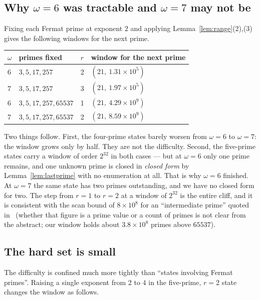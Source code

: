 \documentclass[11pt]{amsart}
\theoremstyle{remark}
\begin{document}
\subsection{Why \texorpdfstring{$\omega = 6$}{omega = 6} was tractable and
\texorpdfstring{$\omega = 7$}{omega = 7} may not be}
Fixing each Fermat prime at exponent $2$ and applying
Lemma~\ref{lem:range}(2),(3) gives the following windows for the next prime.

\begin{table}[h]
\centering
\begin{tabular}{llll}
\toprule
$\omega$ & primes fixed & $r$ & window for the next prime \\
\midrule
6 & $3,5,17,257$          & 2 & $(21,\ 1.31 \times 10^{5})$ \\
7 & $3,5,17,257$          & 3 & $(21,\ 1.97 \times 10^{5})$ \\
6 & $3,5,17,257,65537$    & 1 & $(21,\ 4.29 \times 10^{9})$ \\
7 & $3,5,17,257,65537$    & 2 & $(21,\ 8.59 \times 10^{9})$ \\
\bottomrule
\end{tabular}
\end{table}

Two things follow. First, the four-prime states barely worsen from $\omega = 6$
to $\omega = 7$: the window grows only by half. They are not the difficulty.
Second, the five-prime states carry a window of order $2^{32}$ in both cases ---
but at $\omega = 6$ only one prime remains, and one unknown prime is closed in
\emph{closed form} by Lemma~\ref{lem:lastprime} with no enumeration at all. That
is why $\omega = 6$ finished. At $\omega = 7$ the same state has two primes
outstanding, and we have no closed form for two. The step from $r = 1$ to
$r = 2$ at a window of $2^{32}$ is the entire cliff, and it is consistent with
the scan bound of $8 \times 10^{8}$ for an ``intermediate prime'' quoted
in~\cite{tty} (whether that figure is a prime value or a count of primes is not
clear from the abstract; our window holds about $3.8 \times 10^{8}$ primes above
$65537$).

\subsection{The hard set is small}
The difficulty is confined much more tightly than ``states involving Fermat
primes''. Raising a single exponent from $2$ to $4$ in the five-prime,
$r = 2$ state changes the window as follows.
\end{document}
